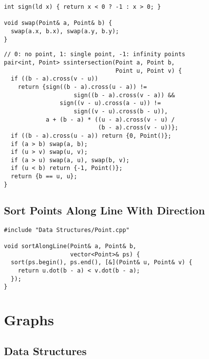 \documentclass[twoside]{article}
\newcommand{\fileTitleStyle}{\large\underline}
\begin{document}
\begin{multicols*}{2}
\begin{verbatim}
int sign(ld x) { return x < 0 ? -1 : x > 0; }

void swap(Point& a, Point& b) {
  swap(a.x, b.x), swap(a.y, b.y);
}
\end{verbatim}
\vspace{-12pt}
\begin{verbatim}
// 0: no point, 1: single point, -1: infinity points
pair<int, Point> ssintersection(Point a, Point b,
                                Point u, Point v) {
  if ((b - a).cross(v - u))
    return {sign((b - a).cross(u - a)) !=
                    sign((b - a).cross(v - a)) &&
                sign((v - u).cross(a - u)) !=
                    sign((v - u).cross(b - u)),
            a + (b - a) * ((u - a).cross(v - u) /
                           (b - a).cross(v - u))};
  if ((b - a).cross(u - a)) return {0, Point()};
  if (a > b) swap(a, b);
  if (u > v) swap(u, v);
  if (a > u) swap(a, u), swap(b, v);
  if (u < b) return {-1, Point()};
  return {b == u, u};
}
\end{verbatim}

\subsectionfont{\centering\bfseries\LARGE}
\subsectionfont{\fileTitleStyle}
\subsection*{Sort Points Along Line With Direction}
\begin{verbatim}
#include "Data Structures/Point.cpp"

void sortAlongLine(Point& a, Point& b,
                   vector<Point>& ps) {
  sort(ps.begin(), ps.end(), [&](Point& u, Point& v) {
    return u.dot(b - a) < v.dot(b - a);
  });
}
\end{verbatim}

\sectionfont{\centering\bfseries\Huge}
\vspace{1em}
\section*{Graphs}
\vspace{3em}
\subsectionfont{\centering\bfseries\LARGE}
\vspace{0em}
\subsection*{Data Structures}
\vspace{2em}
\subsubsectionfont{\centering\bfseries\Large}
\subsubsectionfont{\fileTitleStyle}

\end{multicols*}
\end{document}
